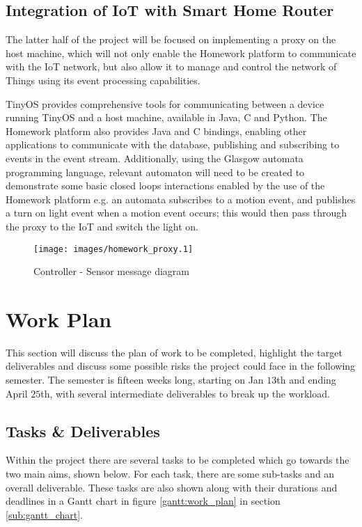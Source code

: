 \documentclass{mprop}
\begin{document}

\subsection{Integration of IoT with Smart Home Router} %
\label{sub:implementation_of_iot_on_smart_home_router}
The latter half of the project will be focused on implementing a proxy on the host machine, which will not only enable the Homework platform to communicate with the IoT network, but also allow it to manage and control the network of Things using its event processing capabilities. 

TinyOS provides comprehensive tools for communicating between a device running TinyOS and a host machine, available in Java, C and Python. The Homework platform also provides Java and C bindings, enabling other applications to communicate with the database, publishing and subscribing to events in the event stream. Additionally, using the Glasgow automata programming language, relevant automaton will need to be created to demonstrate some basic closed loops interactions enabled by the use of the Homework platform e.g. an automata subscribes to a motion event, and publishes a turn on light event when a motion event occurs; this would then pass through the proxy to the IoT and switch the light on.


\begin{figure}[h!]
\centering
\texttt{[image: images/homework\_proxy.1]}
\caption{Controller - Sensor message diagram}
\label{fig:sequence_diagram}
\end{figure}

\section{Work Plan}
This section will discuss the plan of work to be completed, highlight the target deliverables and discuss some possible risks the project could face in the following semester. The semester is fifteen weeks long, starting on Jan $13$th and ending April $25$th, with several intermediate deliverables to break up the workload.


\subsection{Tasks \& Deliverables} %
\label{sub:deliverables}
Within the project there are several tasks to be completed which go towards the two main aims, shown below. For each task, there are some sub-tasks and an overall deliverable. These tasks are also shown along with their durations and deadlines in a Gantt chart in figure \ref{gantt:work_plan} in section \ref{sub:gantt_chart}. 
\end{document}
